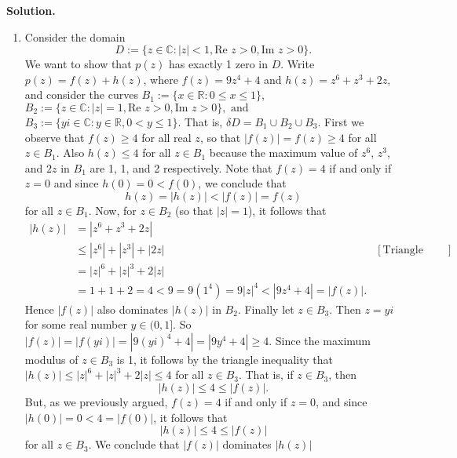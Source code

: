 \documentclass[9pt]{article}
\newcommand{\R}{\mathbb{R}}
\newcommand{\C}{\mathbb{C}}
\begin{document}
\begin{enumerate}
      \textbf{Solution.}

      \begin{enumerate}
         \item Consider the domain
               $$D := \{z \in \C : |z| < 1, \text{Re }z > 0,
                 \text{Im }z > 0\}.$$
               We want to show that $p(z)$ has exactly 1 zero in $D$. Write
               $p(z) = f(z) + h(z)$, where $f(z) = 9z^4 + 4$ and
               $h(z) = z^6 + z^3 + 2z$, and consider the curves
               $B_1 := \{x \in \R : 0 \le x \le 1\}$,
               $B_2 := \{z \in \C : |z| = 1, \text{Re }z > 0,
                 \text{Im }z > 0\}, \text{ and }$
                $B_3 := \{yi \in \C : y \in \R, 0 < y \le 1\}$. That is,
               $\delta D = B_1 \cup B_2 \cup B_3$. First we observe that
               $f(z) \ge 4$ for all real $z$, so that $|f(z)| = f(z) \ge 4$ for
               all $z \in B_1$. Also $h(z) \le 4$ for all $z\in B_1$ because the
               maximum value of $z^6$, $z^3$, and $2z$ in $B_1$ are 1, 1, and 2 
               respectively. Note that $f(z) = 4$ if and only if $z = 0$ and
               since $h(0) = 0 < f(0)$, we conclude that
               $$h(z) = |h(z)| < |f(z)| = f(z)$$
               for all $z \in B_1$. Now, for $z \in B_2$ (so that $|z| = 1$), it 
               follows that
               \begin{align*}
                  |h(z)| &= |z^6 + z^3 + 2z| \\
                     &\le |z^6| + |z^3| + |2z| &[\text{Triangle Inequality}] \\
                     &= |z|^6 + |z|^3 + 2|z| \\
                     &= 1 + 1 + 2 = 4 < 9 = 9(1^4)= 9|z|^4 <
                     |9z^4 + 4| = |f(z)|.
               \end{align*}
               Hence $|f(z)|$ also dominates $|h(z)|$ in $B_2$. Finally let
               $z \in B_3$. Then $z = yi$ for some real number $y \in (0, 1]$.
               So $|f(z)| = |f(yi)| = |9(yi)^4 + 4| = |9y^4 + 4| \ge 4$. Since
               the maximum modulus of $z \in B_3$ is 1, it follows by the
               triangle inequality that $|h(z)| \le |z|^6 + |z|^3 + 2|z| \le 4$ 
               for all $z \in B_3$. That is, if $z \in B_3$, then
               $$|h(z)| \le 4 \le |f(z)|.$$
               But, as we previously argued, $f(z) = 4$ if and only if $z = 0$,
               and since $|h(0)| = 0 < 4 = |f(0)|$, it follows that
               $$|h(z)| \le 4 \le |f(z)|$$
               for all $z \in B_3$. We conclude that $|f(z)|$ dominates $|h(z)|$

\end{enumerate}
\end{enumerate}
\end{document}
